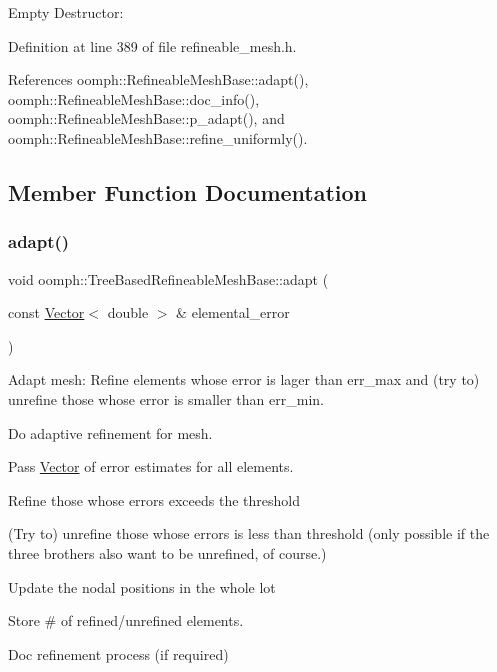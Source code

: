 Empty Destructor\+: 



Definition at line 389 of file refineable\+\_\+mesh.\+h.



References oomph\+::\+Refineable\+Mesh\+Base\+::adapt(), oomph\+::\+Refineable\+Mesh\+Base\+::doc\+\_\+info(), oomph\+::\+Refineable\+Mesh\+Base\+::p\+\_\+adapt(), and oomph\+::\+Refineable\+Mesh\+Base\+::refine\+\_\+uniformly().



\subsection{Member Function Documentation}
\mbox{\label{classoomph_1_1TreeBasedRefineableMeshBase_ac98d4120b99d5c6cbcf7225a9ee5648d}} 
\subsubsection{\texorpdfstring{adapt()}{adapt()}}
{\footnotesize\ttfamily void oomph\+::\+Tree\+Based\+Refineable\+Mesh\+Base\+::adapt (\begin{DoxyParamCaption}\item[{const \hyperlink{classoomph_1_1Vector}{Vector}$<$ double $>$ \&}]{elemental\+\_\+error }\end{DoxyParamCaption})\hspace{0.3cm}{\ttfamily [virtual]}}



Adapt mesh\+: Refine elements whose error is lager than err\+\_\+max and (try to) unrefine those whose error is smaller than err\+\_\+min. 

Do adaptive refinement for mesh.
\begin{DoxyItemize}
\item Pass \hyperlink{classoomph_1_1Vector}{Vector} of error estimates for all elements.
\item Refine those whose errors exceeds the threshold
\item (Try to) unrefine those whose errors is less than threshold (only possible if the three brothers also want to be unrefined, of course.)
\item Update the nodal positions in the whole lot
\item Store \# of refined/unrefined elements.
\item Doc refinement process (if required) 
\end{DoxyItemize}

